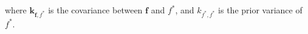 \documentclass[]{interact}
\theoremstyle{plain}%
\theoremstyle{definition}
\theoremstyle{remark}
\begin{document}
\noindent where $\bm{k}_{\bm{f},f^*}$ is the covariance between $\bm{f}$ and $f^*$, and $k_{f^*,f^*}$ is the prior variance of $f^*$. %


 
\end{document}
